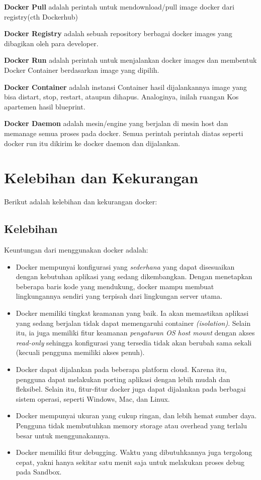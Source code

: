 \textbf{Docker Pull} adalah perintah untuk mendownload/pull image docker dari registry(cth Dockerhub)

\textbf{Docker Registry} adalah sebuah repository berbagai docker images yang dibagikan oleh para developer.

\textbf {Docker Run} adalah perintah untuk menjalankan docker images dan membentuk Docker Container berdasarkan image yang dipilih.

\textbf {Docker Container} adalah instansi Container hasil dijalankannya image yang bisa distart, stop, restart, ataupun dihapus. Analoginya, inilah ruangan Kos apartemen hasil blueprint.

\textbf {Docker Daemon} adalah mesin/engine yang berjalan di mesin host dan memanage semua proses pada docker. Semua perintah perintah diatas seperti docker run itu dikirim ke docker daemon dan dijalankan.

\section{Kelebihan dan Kekurangan}
Berikut adalah kelebihan dan kekurangan docker:


\subsection{Kelebihan}
Keuntungan dari menggunakan docker adalah:
\begin{itemize}
\item Docker mempunyai konfigurasi yang \textit{sederhana} yang dapat disesuaikan dengan kebutuhan aplikasi yang sedang dikembangkan. Dengan menetapkan beberapa baris kode yang mendukung, docker mampu membuat lingkungannya sendiri yang terpisah dari lingkungan server utama.
\item Docker memiliki tingkat keamanan yang baik. Ia akan memastikan aplikasi yang sedang berjalan tidak dapat memengaruhi container \textit{(isolation)}. Selain itu, ia juga memiliki fitur keamanan \textit{pengaturan OS host mount} dengan akses \textit{read-only} sehingga konfigurasi yang tersedia tidak akan berubah sama sekali (kecuali pengguna memiliki akses penuh).
\item Docker dapat dijalankan pada beberapa platform cloud. Karena itu, pengguna dapat melakukan porting aplikasi dengan lebih mudah dan fleksibel. Selain itu, fitur-fitur docker juga dapat dijalankan pada berbagai sistem operasi, seperti Windows, Mac, dan Linux.
\item Docker mempunyai ukuran yang cukup ringan, dan lebih hemat sumber daya. Pengguna tidak membutuhkan memory storage atau overhead yang terlalu besar untuk menggunakannya.
\item Docker memiliki fitur debugging. Waktu yang dibutuhkannya juga tergolong cepat, yakni hanya sekitar satu menit saja untuk melakukan proses debug pada Sandbox.
\end{itemize}

